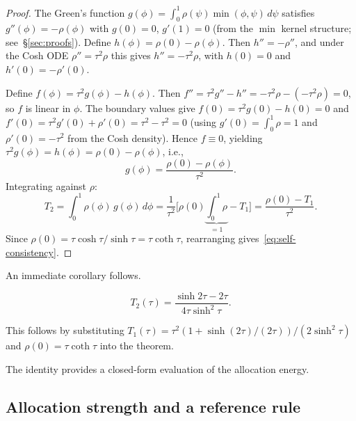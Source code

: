 \begin{proof}
The Green's function $g(\phi) = \int_0^1 \rho(\psi)\min(\phi,\psi)\,d\psi$ satisfies $g''(\phi) = -\rho(\phi)$ with $g(0) = 0$, $g'(1) = 0$ (from the $\min$ kernel structure; see~\S\ref{sec:proofs}). Define $h(\phi) = \rho(0) - \rho(\phi)$. Then $h'' = -\rho''$, and under the Cosh ODE $\rho'' = \tau^2\rho$ this gives $h'' = -\tau^2\rho$, with $h(0) = 0$ and $h'(0) = -\rho'(0)$.

Define $f(\phi) = \tau^2 g(\phi) - h(\phi)$. Then $f'' = \tau^2 g'' - h'' = -\tau^2\rho - (-\tau^2\rho) = 0$, so $f$ is linear in $\phi$. The boundary values give $f(0) = \tau^2 g(0) - h(0) = 0$ and $f'(0) = \tau^2 g'(0) + \rho'(0) = \tau^2 - \tau^2 = 0$ (using $g'(0) = \int_0^1\rho = 1$ and $\rho'(0) = -\tau^2$ from the Cosh density). Hence $f \equiv 0$, yielding $\tau^2 g(\phi) = h(\phi) = \rho(0) - \rho(\phi)$, i.e.,
\begin{equation}
g(\phi) = \frac{\rho(0) - \rho(\phi)}{\tau^2}.
\label{eq:green-identity}
\end{equation}
Integrating against $\rho$:
\begin{equation}
T_2 = \int_0^1 \rho(\phi)\,g(\phi)\,d\phi = \frac{1}{\tau^2}\bigl[\rho(0)\underbrace{\int_0^1\!\rho}_{=1} - T_1\bigr]
= \frac{\rho(0) - T_1}{\tau^2}.
\end{equation}
Since $\rho(0) = \tau\cosh\tau/\sinh\tau = \tau\coth\tau$, rearranging gives~\eqref{eq:self-consistency}.
\end{proof}

An immediate corollary follows.

\begin{corollary}
\begin{equation}
T_2(\tau) = \frac{\sinh 2\tau - 2\tau}{4\tau\sinh^2\tau}.
\end{equation}
\end{corollary}

This follows by substituting
$T_1(\tau)=\tau^2(1+\sinh(2\tau)/(2\tau))/(2\sinh^2\tau)$ and
$\rho(0)=\tau\coth\tau$ into the theorem.

The identity provides a closed-form evaluation of the allocation energy.

\FloatBarrier
\subsection{Allocation strength and a reference rule}
\label{sec:lambda-cv}
\label{sec:tau-scaling}

